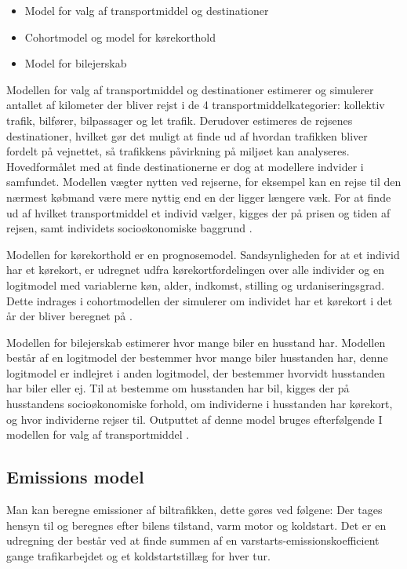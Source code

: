 \begin{itemize}[H]
\item Model for valg af transportmiddel og destinationer
\item Cohortmodel og model for kørekorthold
\item Model for bilejerskab
\end{itemize}

Modellen for valg af transportmiddel og destinationer estimerer og simulerer antallet af kilometer der bliver rejst i de 4 transportmiddelkategorier: kollektiv trafik, bilfører, bilpassager og let trafik. Derudover estimeres de rejsenes destinationer, hvilket gør det muligt at finde ud af hvordan trafikken bliver fordelt på vejnettet, så trafikkens påvirkning på miljøet kan analyseres. Hovedformålet med at finde destinationerne er dog at modellere indvider i samfundet. Modellen vægter nytten ved rejserne, for eksempel kan en rejse til den nærmest købmand være mere nyttig end en der ligger længere væk. For at finde ud af hvilket transportmiddel et individ vælger, kigges der på prisen og tiden af rejsen, samt individets socioøkonomiske baggrund \cite[s. 26-27]{dmumodelanalyser}.

\vspace{5mm}

Modellen for kørekorthold er en prognosemodel. Sandsynligheden for at et individ har et kørekort, er udregnet udfra kørekortfordelingen over alle individer og en logitmodel med variablerne køn, alder, indkomst, stilling og urdaniseringsgrad. Dette indrages i cohortmodellen der simulerer om individet har et kørekort i det år der bliver beregnet på \cite[s. 30]{dmumodelanalyser}.

\vspace{5mm}

Modellen for bilejerskab estimerer hvor mange biler en husstand har. Modellen består af en logitmodel der bestemmer hvor mange biler husstanden har, denne logitmodel er indlejret i anden logitmodel, der bestemmer hvorvidt husstanden har biler eller ej. Til at bestemme om husstanden har bil, kigges der på husstandens socioøkonomiske forhold, om individerne i husstanden har kørekort, og hvor individerne rejser til. Outputtet af denne model bruges efterfølgende I modellen for valg af transportmiddel \cite[s. 29-30]{dmumodelanalyser}.


\subsection{Emissions model}
Man kan beregne emissioner af biltrafikken, dette gøres ved følgene: Der tages hensyn til og beregnes efter bilens tilstand, varm motor og koldstart. Det er en udregning der består ved at finde summen af en varstarts-emissionskoefficient gange trafikarbejdet og et koldstartstillæg for hver tur.

